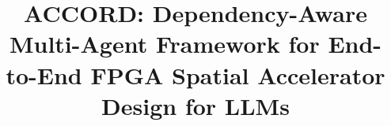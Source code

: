 \documentclass[9pt,conference]{IEEEtran}
\begin{document}
\title{ACCORD: Dependency-Aware Multi-Agent Framework for End-to-End FPGA Spatial Accelerator Design for LLMs\\
}


\maketitle
\end{document}
